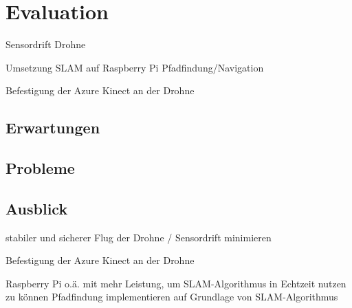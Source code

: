 \chapter{Evaluation}


Sensordrift Drohne

Umsetzung SLAM auf Raspberry Pi
Pfadfindung/Navigation

Befestigung der Azure Kinect an der Drohne




\section{Erwartungen}

\section{Probleme}




\section{Ausblick}
stabiler und sicherer Flug der Drohne / Sensordrift minimieren

Befestigung der Azure Kinect an der Drohne

Raspberry Pi o.ä. mit mehr Leistung, um SLAM-Algorithmus in Echtzeit nutzen zu können
Pfadfindung implementieren auf Grundlage von SLAM-Algorithmus 